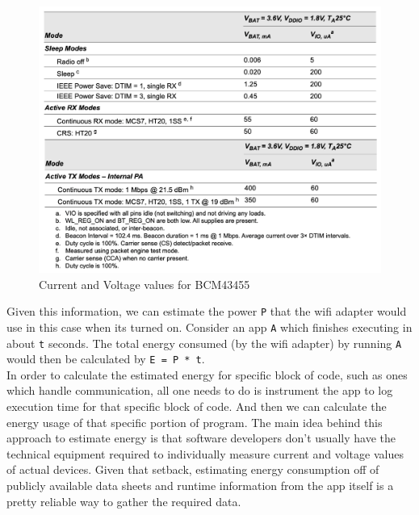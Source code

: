 \begin{figure}
    \begin{center}
        \includegraphics[scale=0.25]{Figs/datasheet.png}    
    \end{center}
    \caption{Current and Voltage values for BCM43455}
    \label{fig:bcm}
\end{figure}

Given this information, we can estimate the power \texttt{P} that the wifi adapter would use in this case when its 
turned on. Consider an app \texttt{A} which finishes executing in about \texttt{t} seconds. The total energy 
consumed (by the wifi adapter) by running \texttt{A} would then be calculated by \texttt{E = P * t}. \\
In order to calculate the estimated energy for specific block of code, such as ones which handle communication, all one 
needs to do is instrument the app to log execution time for that specific block of code. And then we can 
calculate the energy usage of that specific portion of program. The main idea behind this approach to 
estimate energy is that software developers don't usually have the technical equipment required to 
individually measure current and voltage values of actual devices. Given that setback, estimating energy 
consumption off of publicly available data sheets and runtime information from the app itself is a 
pretty reliable way to gather the required data. \\

